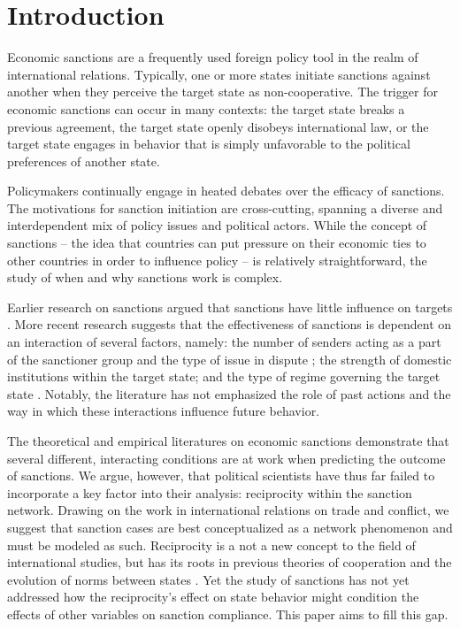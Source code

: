 \section*{Introduction}
\label{intro}

Economic sanctions are a frequently used foreign policy tool in the realm of international relations. Typically, one or more states initiate sanctions against another when they perceive the target state as non-cooperative. The trigger for economic sanctions can occur in many contexts: the target state breaks a previous agreement, the target state openly disobeys international law, or the target state engages in behavior that is simply unfavorable to the political preferences of another state. 

Policymakers continually engage in heated debates over the efficacy of sanctions. The motivations for sanction initiation are cross-cutting, spanning a diverse and interdependent mix of policy issues and political actors. While the concept of sanctions -- the idea that countries can put pressure on their economic ties to other countries in order to influence policy -- is relatively straightforward, the study of when and why sanctions work is complex. 

Earlier research on sanctions argued that sanctions have little influence on targets \citep{lam1990, dashti1997, morgan1997, drezner1998}. More recent research suggests that the effectiveness of sanctions is dependent on an interaction of several factors, namely: the number of senders acting as a part of the sanctioner group and the type of issue in dispute \citep{miers2002, morgan2009threat}; the strength of domestic institutions within the target state; and the type of regime governing the target state \citep{mcgillivray2004}. Notably, the literature has not emphasized the role of past actions and the way in which these interactions influence future behavior.

The theoretical and empirical literatures on economic sanctions demonstrate that several different, interacting conditions are at work when predicting the outcome of sanctions. We argue, however, that political scientists have thus far failed to incorporate a key factor into their analysis: reciprocity within the sanction network. Drawing on the work in international relations on trade and conflict, we suggest that sanction cases are best conceptualized as a network phenomenon and must be modeled as such. Reciprocity is a not a new concept to the field of international studies, but has its roots in previous theories of cooperation and the evolution of norms between states \citep{keohane1989reciprocity,goldstein1991reciprocity,rajmaira1990evolving,ward1992reciprocity}. Yet the study of sanctions has not yet addressed how the reciprocity's effect on state behavior might condition the effects of other variables on sanction compliance. This paper aims to fill this gap.


